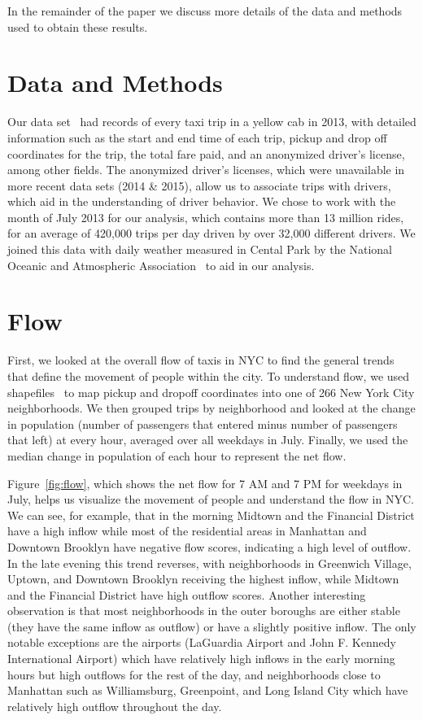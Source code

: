 \documentclass[twocolumn]{article}
\begin{document}
In the remainder of the paper we discuss more details of the data and methods used to obtain these results.

\section{Data and Methods}
Our data set~\cite{WHONG:2014} had records of every taxi trip in a yellow cab in 2013, with detailed information such as the start and end time of each trip, pickup and drop off coordinates for the trip, the total fare paid, and an anonymized driver's license, among other fields. The anonymized driver's licenses, which were unavailable in more recent data sets (2014 \& 2015), allow us to associate trips with drivers, which aid in the understanding of driver behavior. %
We chose to work with the month of July 2013 for our analysis, which contains more than 13 million rides, for an average of 420,000 trips per day driven by over 32,000 different drivers.
We joined this data with daily weather measured in Cental Park by the National Oceanic and Atmospheric Association~\cite{NOAA:2016} to aid in our analysis.

\section{Flow}
First, we looked at the overall flow of taxis in NYC to find the general trends that define the movement of people within the city. To understand flow, we used shapefiles~\cite{PEDIACITIES:2015} to map pickup and dropoff coordinates into one of 266 New York City neighborhoods. We then grouped trips by neighborhood and looked at the change in population (number of passengers that entered minus number of passengers that left) at every hour, averaged over all weekdays in July. Finally, we used the median change in population of each hour to represent the net flow.

Figure~\ref{fig:flow}, which shows the net flow for 7 AM and 7 PM for weekdays in July, helps us visualize the movement of people and understand the flow in NYC. We can see, for example, that in the morning Midtown and the Financial District have a high inflow while most of the residential areas in Manhattan and Downtown Brooklyn have negative flow scores, indicating a high level of outflow. In the late evening this trend reverses, with neighborhoods in Greenwich Village, Uptown, and Downtown Brooklyn receiving the highest inflow, while Midtown and the Financial District have high outflow scores. Another interesting observation is that most neighborhoods in the outer boroughs are either stable (they have the same inflow as outflow) or have a slightly positive inflow. The only notable exceptions are the airports (LaGuardia Airport and John F. Kennedy International Airport) which have relatively high inflows in the early morning hours but high outflows for the rest of the day, and neighborhoods close to Manhattan such as Williamsburg, Greenpoint, and Long Island City which have relatively high outflow throughout the day.
\end{document}
